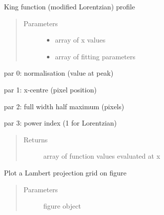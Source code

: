 \documentclass[letterpaper,10pt,english]{sphinxmanual}
\begin{document}

\begin{fulllineitems}
\label{\detokenize{images_functions:images.king_profile}}
King function (modified Lorentzian) profile
\begin{quote}\begin{description}
\item[{Parameters}] \leavevmode\begin{itemize}
\item {} 
 \textendash{} array of x values

\item {} 
 \textendash{} array of fitting parameters

\end{itemize}

\end{description}\end{quote}

\begin{DUlineblock}{0em}
\item[] par 0: normalisation (value at peak)
\item[] par 1: x-centre (pixel position)
\item[] par 2: full width half maximum (pixels)
\item[] par 3: power index (1 for Lorentzian)
\end{DUlineblock}
\begin{quote}\begin{description}
\item[{Returns}] \leavevmode
array of function values evaluated at x

\end{description}\end{quote}

\end{fulllineitems}


\begin{fulllineitems}
\label{\detokenize{images_functions:images.lamgrid}}
Plot a Lambert projection grid on figure
\begin{quote}\begin{description}
\item[{Parameters}] \leavevmode
{} \textendash{} figure object

\end{description}\end{quote}

\end{fulllineitems}
\end{document}
